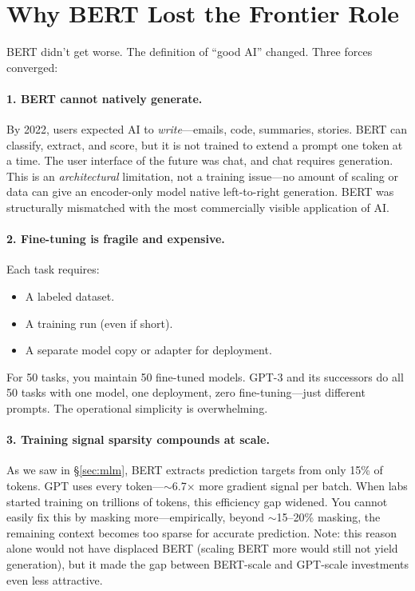 \section{Why BERT Lost the Frontier Role}
\label{sec:bert-lost}

BERT didn't get worse. The definition of ``good AI'' changed. Three forces converged:

\paragraph{1. BERT cannot natively generate.} By 2022, users expected AI to \emph{write}---emails, code, summaries, stories. BERT can classify, extract, and score, but it is not trained to extend a prompt one token at a time. The user interface of the future was chat, and chat requires generation. This is an \emph{architectural} limitation, not a training issue---no amount of scaling or data can give an encoder-only model native left-to-right generation. BERT was structurally mismatched with the most commercially visible application of AI.

\paragraph{2. Fine-tuning is fragile and expensive.} Each task requires:
\begin{itemize}[nosep]
  \item A labeled dataset.
  \item A training run (even if short).
  \item A separate model copy or adapter for deployment.
\end{itemize}
For 50 tasks, you maintain 50 fine-tuned models. GPT-3 and its successors do all 50 tasks with one model, one deployment, zero fine-tuning---just different prompts. The operational simplicity is overwhelming.

\paragraph{3. Training signal sparsity compounds at scale.} As we saw in \S\ref{sec:mlm}, BERT extracts prediction targets from only 15\% of tokens. GPT uses every token---$\sim$6.7$\times$ more gradient signal per batch. When labs started training on trillions of tokens, this efficiency gap widened. You cannot easily fix this by masking more---empirically, beyond $\sim$15--20\% masking, the remaining context becomes too sparse for accurate prediction. Note: this reason alone would not have displaced BERT (scaling BERT more would still not yield generation), but it made the gap between BERT-scale and GPT-scale investments even less attractive.


